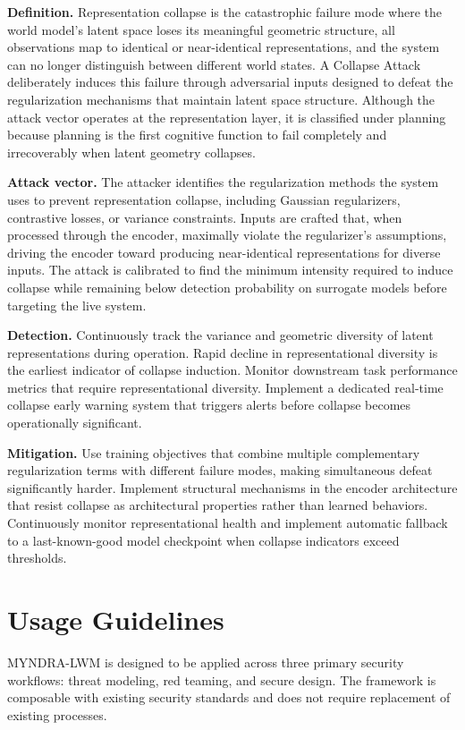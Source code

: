 \documentclass[11pt,a4paper]{article}
\begin{document}
\textbf{Definition.} Representation collapse is the catastrophic failure mode where the world model's latent space loses its meaningful geometric structure, all observations map to identical or near-identical representations, and the system can no longer distinguish between different world states. A Collapse Attack deliberately induces this failure through adversarial inputs designed to defeat the regularization mechanisms that maintain latent space structure. Although the attack vector operates at the representation layer, it is classified under planning because planning is the first cognitive function to fail completely and irrecoverably when latent geometry collapses.

\textbf{Attack vector.} The attacker identifies the regularization methods the system uses to prevent representation collapse, including Gaussian regularizers, contrastive losses, or variance constraints. Inputs are crafted that, when processed through the encoder, maximally violate the regularizer's assumptions, driving the encoder toward producing near-identical representations for diverse inputs. The attack is calibrated to find the minimum intensity required to induce collapse while remaining below detection probability on surrogate models before targeting the live system.

\textbf{Detection.} Continuously track the variance and geometric diversity of latent representations during operation. Rapid decline in representational diversity is the earliest indicator of collapse induction. Monitor downstream task performance metrics that require representational diversity. Implement a dedicated real-time collapse early warning system that triggers alerts before collapse becomes operationally significant.

\textbf{Mitigation.} Use training objectives that combine multiple complementary regularization terms with different failure modes, making simultaneous defeat significantly harder. Implement structural mechanisms in the encoder architecture that resist collapse as architectural properties rather than learned behaviors. Continuously monitor representational health and implement automatic fallback to a last-known-good model checkpoint when collapse indicators exceed thresholds.

\section{Usage Guidelines}

MYNDRA-LWM is designed to be applied across three primary security workflows: threat modeling, red teaming, and secure design. The framework is composable with existing security standards and does not require replacement of existing processes.
\end{document}
